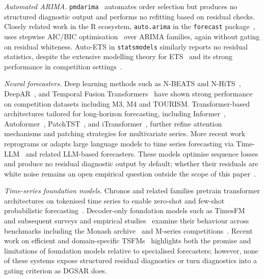 \documentclass[sn-mathphys-num,pdflatex]{sn-jnl}
\begin{document}
\textit{Automated ARIMA.}
\texttt{pmdarima}~\cite{pmdarima} automates order selection but produces
no structured diagnostic output and performs no refitting based on
residual checks. Closely related work in the R ecosystem,
\texttt{auto.arima} in the \texttt{forecast} package~\cite{hyndman2008forecast},
uses stepwise AIC/BIC optimisation~\cite{akaike1974aic, schwarz1978bic}
over ARIMA families, again without gating on residual whiteness.
Auto-ETS in \texttt{statsmodels} similarly reports
no residual statistics, despite the extensive modelling theory
for ETS~\cite{gardner2006exp} and its strong performance in competition
settings~\cite{makridakis2020m4, assimakopoulos2000theta}.

\textit{Neural forecasters.}
Deep learning methods such as N-BEATS and N-HiTS~\cite{oreshkin2019nbeats, challu2022nhits},
DeepAR~\cite{salinas2020deepar}, and Temporal Fusion Transformers~\cite{lim2021tft}
have shown strong performance on competition datasets including M3, M4 and TOURISM.
Transformer-based architectures tailored for long-horizon forecasting,
including Informer~\cite{zhou2021informer}, Autoformer~\cite{wu2021autoformer},
PatchTST~\cite{nie2022patchtst}, and iTransformer~\cite{zhou2023itransformer},
further refine attention mechanisms and patching strategies for multivariate
series. More recent work reprograms or adapts large language models
to time series forecasting via Time-LLM~\cite{jin2023timellm} and
related LLM-based forecasters. These models optimise sequence losses
and produce no residual diagnostic output by default; whether their
residuals are white noise remains an open empirical question outside
the scope of this paper~\cite{li2019enhancing, hewamalage2023pitfalls}.

\textit{Time-series foundation models.}
Chronos and related families pretrain transformer architectures on
tokenised time series to enable zero-shot and few-shot probabilistic
forecasting~\cite{ansari2024chronos}.
Decoder-only foundation models such as TimesFM~\cite{das2024timesfm}
and subsequent surveys and empirical studies~\cite{kottapalli2025survey, achour2025conformal}
examine their behaviour across benchmarks including the Monash archive~\cite{godahewa2021monash}
and M-series competitions~\cite{makridakis2020m4, makridakis2022m5}.
Recent work on efficient and domain-specific TSFMs~\cite{fu2026reverso, karaouli2025foundational, rahimikia2025finance, yu2025pmf}
highlights both the promise and limitations of foundation models relative
to specialised forecasters; however, none of these systems expose
structured residual diagnostics or turn diagnostics into a gating
criterion as DGSAR does.
\end{document}
